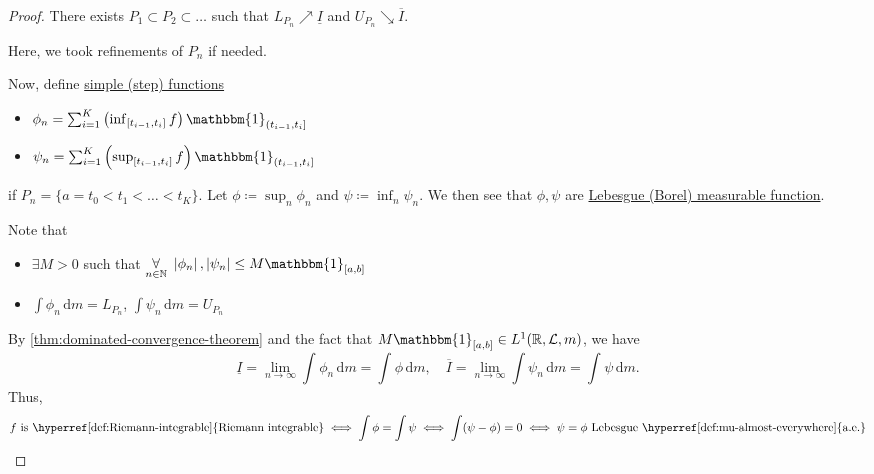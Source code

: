 \begin{proof}
	There exists \(P_1\subset P_2\subset \dots  \) such that \(L_{P_{n}}\nearrow \underline{I} \) and \(U_{P_{n}}\searrow \overline{I} \).
	\begin{note}
		Here, we took refinements of \(P_{n}\) if needed.
	\end{note}
	Now, define \hyperref[def:simple-function]{simple (step) functions}
	\begin{itemize}
		\item \(\phi _{n} = \sum_{i=1}^{K} \left(\inf_{[t_{i-1}, t_{i}]} f \right) \mathbbm{1}_{(t_{i-1}, t_{i}]} \)
		\item \(\psi _{n} = \sum_{i=1}^{K} \left(\sup_{[t_{i-1}, t_{i}]} f \right) \mathbbm{1}_{(t_{i-1}, t_{i}]} \)
	\end{itemize}
	if \(P_{n} = \{a = t_0 < t_1 < \dots < t_{K} \}\). Let \(\phi \coloneqq \sup_n \phi _{n}\) and \(\psi \coloneqq \inf _n \psi _{n}\).
	We then see that \(\phi , \psi \) are \hyperref[def:measurable-function]{Lebesgue (Borel) measurable function}.
	\begin{note}
		Note that
		\begin{itemize}
			\item \(\exists M> 0\) such that \(\underset{n\in\mathbb{N} }{\forall }\ \left\vert \phi _{n} \right\vert, \left\vert \psi _{n} \right\vert \leq M\mathbbm{1}_{[a, b]} \)
			\item \(\int \phi _{n}\,\mathrm{d}m = L_{P_{n}}\), \(\int \psi _{n}\,\mathrm{d}m = U_{P_{n}}\)
		\end{itemize}
	\end{note}
	By \autoref{thm:dominated-convergence-theorem} and the fact that \(M\mathbbm{1}_{[a, b]} \in L^1(\mathbb{R} , \mathcal{L} , m) \),
	we have
	\[
		\underline{I} = \lim_{n \to \infty} \int_{}^{} \phi _{n} \,\mathrm{d}m = \int_{}^{} \phi  \,\mathrm{d}m,\quad
		\overline{I} = \lim_{n \to \infty} \int \psi _n\,\mathrm{d} m = \int_{}^{} \psi  \,\mathrm{d}m.
	\]
	Thus,
	\[
		f \text{ is \hyperref[def:Riemann-integrable]{Riemann integrable}}
		\iff \int \phi = \int \psi
		\iff \int (\psi - \phi ) = 0
		\iff \psi = \phi \text{ Lebesgue \hyperref[def:mu-almost-everywhere]{a.e.}}
	\]
\end{proof}

